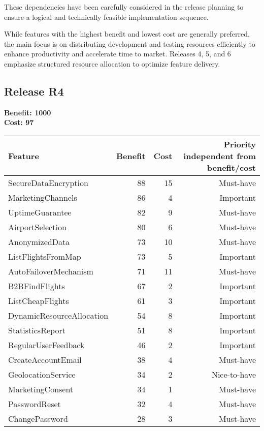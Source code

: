 These dependencies have been carefully considered in the release planning to ensure a logical and technically feasible implementation sequence.

While features with the highest benefit and lowest cost are generally preferred, the main focus is on distributing development and testing resources efficiently to enhance productivity and accelerate time to market. Releases 4, 5, and 6 emphasize structured resource allocation to optimize feature delivery.


\subsection{Release R4}
\textbf{Benefit: 1000} \\
\textbf{Cost: 97} \\

\begin{tabular}{lrrr}
\toprule
\textbf{Feature} & \textbf{Benefit} & \textbf{Cost} & \textbf{Priority} independent from benefit/cost \\
\midrule
SecureDataEncryption & 88 & 15 & Must-have \\
MarketingChannels & 86 & 4 & Important \\
UptimeGuarantee & 82 & 9 & Must-have \\
AirportSelection & 80 & 6 & Must-have \\
AnonymizedData & 73 & 10 & Must-have \\
ListFlightsFromMap & 73 & 5 & Important \\
AutoFailoverMechanism & 71 & 11 & Must-have \\
B2BFindFlights & 67 & 2 & Important \\
ListCheapFlights & 61 & 3 & Important \\
DynamicResourceAllocation & 54 & 8 & Important \\
StatisticsReport & 51 & 8 & Important \\
RegularUserFeedback & 46 & 2 & Important \\
CreateAccountEmail & 38 & 4 & Must-have \\
GeolocationService & 34 & 2 & Nice-to-have \\
MarketingConsent & 34 & 1 & Must-have \\
PasswordReset & 32 & 4 & Must-have \\
ChangePassword & 28 & 3 & Must-have \\
\bottomrule 
\end{tabular}


